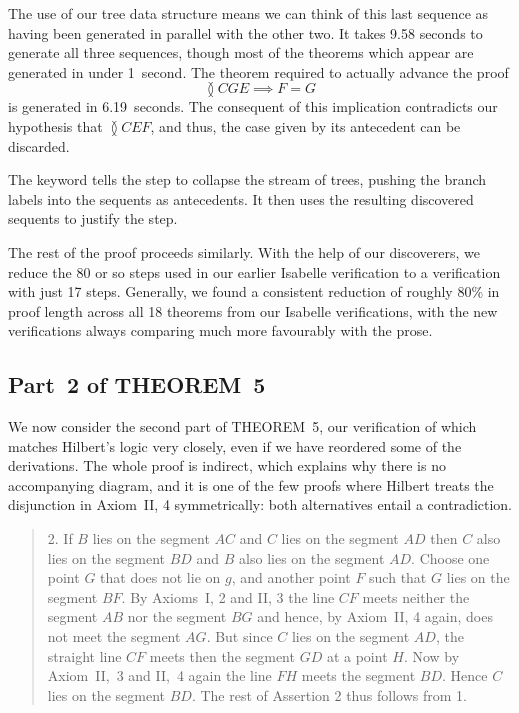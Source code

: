 The use of our tree data structure means we can think of this last sequence as having been generated in parallel with the other two. It takes 9.58 seconds to generate all three sequences, though most of the theorems which appear are generated in under 1~second. The theorem required to actually advance the proof
\begin{displaymath}
\between{C}{G}{E} \implies F = G
\end{displaymath}
is generated in 6.19~seconds. The consequent of this implication contradicts our hypothesis that $\between{C}{E}{F}$, and thus, the case given by its antecedent can be discarded.

\linebreak

The  keyword tells the step to collapse the stream of trees, pushing the branch labels into the sequents as antecedents. It then uses the resulting discovered sequents to justify the step.

The rest of the proof proceeds similarly. With the help of our discoverers, we reduce the 80 or so steps used in our earlier Isabelle verification to a verification with just 17 steps. Generally, we found a consistent reduction of roughly 80\% in proof length across all 18 theorems from our Isabelle verifications, with the new verifications always comparing much more favourably with the prose.

\subsection{Part~2 of THEOREM~5}
We now consider the second part of THEOREM~5, our verification of which matches Hilbert's logic very closely, even if we have reordered some of the derivations. The whole proof is indirect, which explains why there is no accompanying diagram, and it is one of the few proofs where Hilbert treats the disjunction in Axiom~II, 4 symmetrically: both alternatives entail a contradiction.

\begin{quote}2. If $B$ lies on the segment $AC$ and $C$ lies on the segment $AD$ then $C$ also lies on the segment $BD$ and $B$ also lies on the segment $AD$. Choose one point $G$ that does not lie on $g$, and another point $F$ such that $G$ lies on the segment $BF$. By Axioms~I, 2 and II, 3 the line $CF$ meets neither the segment $AB$ nor the segment $BG$ and hence, by Axiom~II, 4 again, does not meet the segment $AG$. But since $C$ lies on the segment $AD$, the straight line $CF$ meets then the segment $GD$ at a point $H$. Now by Axiom~II,~3 and II,~4 again the line $FH$ meets the segment $BD$. Hence $C$ lies on the segment $BD$. The rest of Assertion 2 thus follows from 1.
\end{quote}

